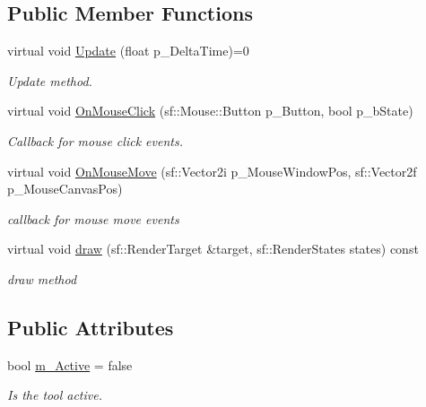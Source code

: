 \subsection*{Public Member Functions}
\begin{DoxyCompactItemize}
\item 
\mbox{\label{class_i_tool_aaee4d261cdadf0bab515ae3d0ad9fe86}} 
virtual void \hyperlink{class_i_tool_aaee4d261cdadf0bab515ae3d0ad9fe86}{Update} (float p\+\_\+\+Delta\+Time)=0
\begin{DoxyCompactList}\small\item\em Update method. \end{DoxyCompactList}\item 
\mbox{\label{class_i_tool_a1af006baeba70bb9d2a77655e5f43827}} 
virtual void \hyperlink{class_i_tool_a1af006baeba70bb9d2a77655e5f43827}{On\+Mouse\+Click} (sf\+::\+Mouse\+::\+Button p\+\_\+\+Button, bool p\+\_\+b\+State)
\begin{DoxyCompactList}\small\item\em Callback for mouse click events. \end{DoxyCompactList}\item 
\mbox{\label{class_i_tool_a650ec05672cd537ef7fd68f220fa9569}} 
virtual void \hyperlink{class_i_tool_a650ec05672cd537ef7fd68f220fa9569}{On\+Mouse\+Move} (sf\+::\+Vector2i p\+\_\+\+Mouse\+Window\+Pos, sf\+::\+Vector2f p\+\_\+\+Mouse\+Canvas\+Pos)
\begin{DoxyCompactList}\small\item\em callback for mouse move events \end{DoxyCompactList}\item 
\mbox{\label{class_i_tool_aa48cc732ed27ccbbaf4731aee956e959}} 
virtual void \hyperlink{class_i_tool_aa48cc732ed27ccbbaf4731aee956e959}{draw} (sf\+::\+Render\+Target \&target, sf\+::\+Render\+States states) const
\begin{DoxyCompactList}\small\item\em draw method \end{DoxyCompactList}\end{DoxyCompactItemize}
\subsection*{Public Attributes}
\begin{DoxyCompactItemize}
\item 
\mbox{\label{class_i_tool_a899ebf4a35a3ba0d6933db8e07f075bc}} 
bool \hyperlink{class_i_tool_a899ebf4a35a3ba0d6933db8e07f075bc}{m\+\_\+\+Active} = false
\begin{DoxyCompactList}\small\item\em Is the tool active. \end{DoxyCompactList}\end{DoxyCompactItemize}
